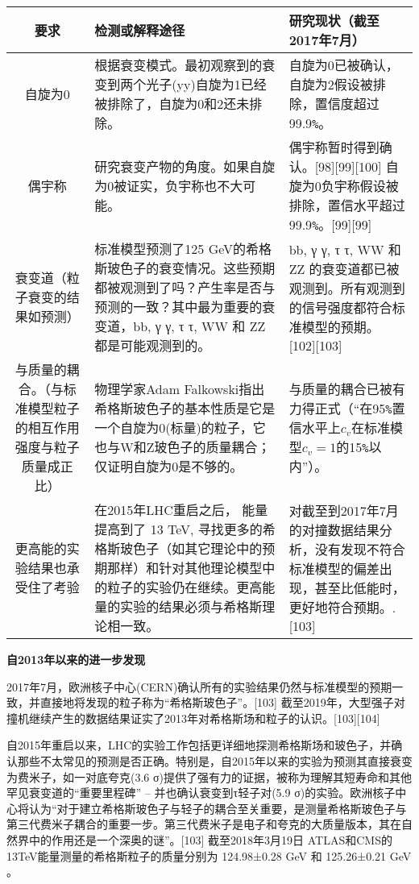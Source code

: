 \begin{table}[h]
\centering
\caption\label{tab_Higgs_1}
\begin{tabular}{|c|p{5cm}|p{5cm}|}
\hline
\textbf{要求} & \textbf{检测或解释途径} & \textbf{研究现状（截至2017年7月）} \\ \hline
自旋为0 & 根据衰变模式。最初观察到的衰变到两个光子(yy)自旋为1已经被排除了，自旋为0和2还未排除。 & 自旋为0已被确认，自旋为2假设被排除，置信度超过99.9\verb|%|。 \\ 
\hline
偶宇称 & 研究衰变产物的角度。如果自旋为0被证实，负宇称也不大可能。 & 偶宇称暂时得到确认。[98][99][100] 自旋为0负宇称假设被排除，置信水平超过99.9\verb|%|。[99][99] \\ 
\hline
衰变道（粒子衰变的结果如预测） & 标准模型预测了125 GeV的希格斯玻色子的衰变情况。这些预期都被观测到了吗？产生率是否与预测的一致？其中最为重要的衰变道，bb, γ γ, τ τ, WW 和 ZZ 都是可能观测到的。 & bb, γ γ, τ τ, WW 和 ZZ 的衰变道都已被观测到。所有观测到的信号强度都符合标准模型的预期。 [102][103] \\ 
\hline
与质量的耦合。（与标准模型粒子的相互作用强度与粒子质量成正比） & 物理学家Adam Falkowski指出希格斯玻色子的基本性质是它是一个自旋为0(标量)的粒子，它也与W和Z玻色子的质量耦合；仅证明自旋为0是不够的。 & 与质量的耦合已被有力得正式（“在95\verb|%|置信水平上$c_{v}$在标准模型$c_{v}=1$的15\verb|%|以内”）。 \\ 
\hline
更高能的实验结果也承受住了考验 & 在2015年LHC重启之后， 能量提高到了 13 TeV, 寻找更多的希格斯玻色子（如其它理论中的预期那样）和针对其他理论模型中的粒子的实验仍在继续。更高能量的实验的结果必须与希格斯理论相一致。 & 对截至到2017年7月的对撞数据结果分析，没有发现不符合标准模型的偏差出现，甚至比低能时，更好地符合预期。.[103]\\ \hline
\end{tabular}
\end{table}

\textbf{自2013年以来的进一步发现}

2017年7月，欧洲核子中心(CERN)确认所有的实验结果仍然与标准模型的预期一致，并直接地将发现的粒子称为“希格斯玻色子”。[103] 截至2019年，大型强子对撞机继续产生的数据结果证实了2013年对希格斯场和粒子的认识。[103][104]

自2015年重启以来，LHC的实验工作包括更详细地探测希格斯场和玻色子，并确认那些不太常见的预测是否正确。特别是，自2015年以来的实验为预测其直接衰变为费米子，如一对底夸克(3.6 σ)提供了强有力的证据，被称为理解其短寿命和其他罕见衰变道的“重要里程碑” – 并也确认衰变到τ轻子对(5.9 σ)的实验。欧洲核子中心将认为“对于建立希格斯玻色子与轻子的耦合至关重要，是测量希格斯玻色子与第三代费米子耦合的重要一步。第三代费米子是电子和夸克的大质量版本，其在自然界中的作用还是一个深奥的谜”。[103] 截至2018年3月19日 ATLAS和CMS的13TeV能量测量的希格斯粒子的质量分别为 124.98±0.28 GeV 和 125.26±0.21 GeV 。

